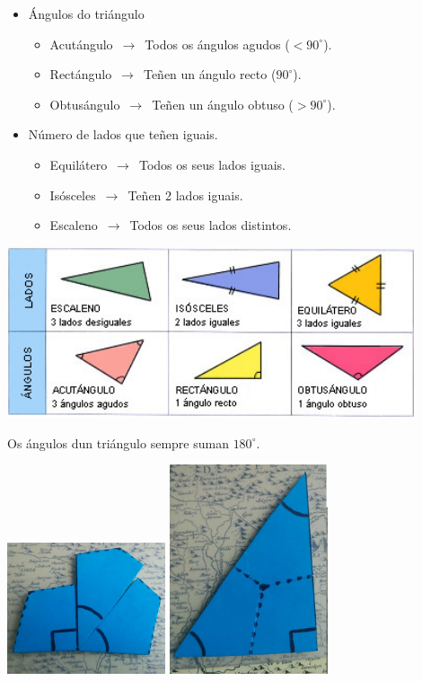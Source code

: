 \begin{itemize}
    \item Ángulos do triángulo
    \begin{itemize}
        \item Acutángulo $\,\to\,$ Todos os ángulos agudos ($< 90^{\circ}$).
        \item Rectángulo $\,\to\,$ Teñen un ángulo recto ($90^{\circ}$).
        \item Obtusángulo $\,\to\,$ Teñen un ángulo obtuso ($> 90^{\circ}$).
    \end{itemize}
    \item Número de lados que teñen iguais.
    \begin{itemize}
        \item Equilátero $\,\to\,$ Todos os seus lados iguais.
        \item Isósceles $\,\to\,$ Teñen 2 lados iguais.
        \item Escaleno $\,\to\,$ Todos os seus lados distintos.
    \end{itemize}
\end{itemize}

\begin{center}
    \includegraphics[width=0.9\textwidth]{img/clasiftriangulos.jpg}
\end{center}

Os ángulos dun triángulo sempre suman $180^{\circ}$.

\begin{center}
    \includegraphics[width=0.35\textwidth]{img/180grados-1.png}
    \includegraphics[width=0.35\textwidth]{img/180grados-2.png}
\end{center}

